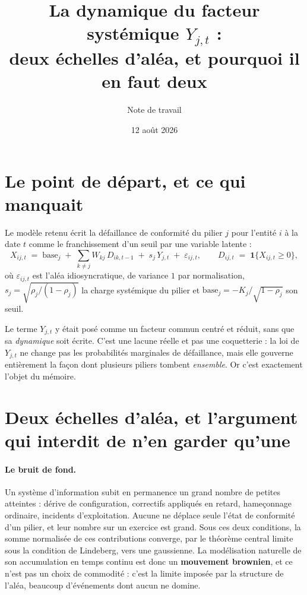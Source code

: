 \documentclass[11pt,a4paper]{article}
\title{La dynamique du facteur systémique $Y_{j,t}$ :\\ deux échelles d'aléa, et pourquoi
il en faut deux}
\author{Note de travail}
\date{12 août 2026}
\begin{document}
\maketitle

\section{Le point de départ, et ce qui manquait}

Le modèle retenu écrit la défaillance de conformité du pilier $j$ pour l'entité $i$ à la
date $t$ comme le franchissement d'un seuil par une variable latente :
\begin{equation}
\label{eq:latente}
  X_{ij,t} \;=\; \text{base}_j \;+\; \sum_{k\neq j} W_{kj}\,D_{ik,t-1}
  \;+\; s_j\,Y_{j,t} \;+\; \varepsilon_{ij,t},
  \qquad D_{ij,t} \;=\; \mathbf 1\{X_{ij,t} \geq 0\},
\end{equation}
où $\varepsilon_{ij,t}$ est l'aléa idiosyncratique, de variance $1$ par normalisation,
$s_j = \sqrt{\rho_j/(1-\rho_j)}$ la charge systémique du pilier et
$\text{base}_j = -K_j/\sqrt{1-\rho_j}$ son seuil.

Le terme $Y_{j,t}$ y était posé comme un facteur commun centré et réduit, sans que sa
\emph{dynamique} soit écrite. C'est une lacune réelle et pas une coquetterie : la loi de
$Y_{j,t}$ ne change pas les probabilités marginales de défaillance, mais elle gouverne
entièrement la façon dont plusieurs piliers tombent \emph{ensemble}. Or c'est exactement
l'objet du mémoire.

\section{Deux échelles d'aléa, et l'argument qui interdit de n'en garder qu'une}

\paragraph{Le bruit de fond.} Un système d'information subit en permanence un grand nombre
de petites atteintes : dérive de configuration, correctifs appliqués en retard,
hameçonnage ordinaire, incidents d'exploitation. Aucune ne déplace seule l'état de
conformité d'un pilier, et leur nombre sur un exercice est grand. Sous ces deux conditions,
la somme normalisée de ces contributions converge, par le théorème central limite sous la
condition de Lindeberg, vers une gaussienne. La modélisation naturelle de son accumulation
en temps continu est donc un \textbf{mouvement brownien}, et ce n'est pas un choix de
commodité : c'est la limite imposée par la structure de l'aléa, beaucoup d'événements dont
aucun ne domine.
\end{document}
